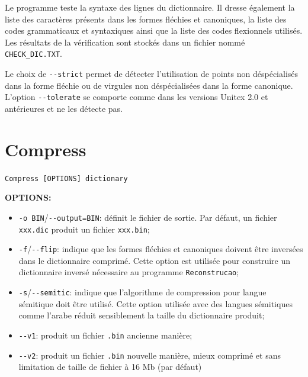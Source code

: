 \bigskip
\noindent Le programme teste la syntaxe des lignes du dictionnaire. Il dresse également la liste des
caractères présents dans les formes fléchies et canoniques, la liste des codes grammaticaux
et syntaxiques ainsi que la liste des codes flexionnels utilisés. Les résultats de la vérification
sont stockés dans un fichier nommé \verb+CHECK_DIC.TXT+.

\bigskip
\noindent Le choix de \verb+--strict+ permet de détecter l'utilisation de points non déspécialisés
dans la forme fléchie ou de virgules non déspécialisées dans la forme canonique. L'option
\verb+--tolerate+ se comporte comme dans les versions Unitex 2.0 et antérieures et ne les détecte
pas.





\section{Compress}
\label{section-compress}
\verb+Compress [OPTIONS] dictionary+

\bigskip
\noindent \textbf{OPTIONS:}
\begin{itemize}
\item \verb+-o BIN+/\verb+--output=BIN+: définit le fichier de sortie. Par défaut, un fichier
	\verb+xxx.dic+ produit un fichier \verb+xxx.bin+;
\item \verb+-f+/\verb+--flip+: indique que les formes fléchies et canoniques doivent être inversées
dans le dictionnaire comprimé. Cette option est utilisée pour construire un dictionnaire inversé
nécessaire au programme \verb+Reconstrucao+;
\item \verb+-s+/\verb+--semitic+: indique que l'algorithme de compression pour langue sémitique doit
être utilisé. Cette option utilisée avec des langues sémitiques comme l'arabe réduit sensiblement la
taille du dictionnaire produit;
\item \verb+--v1+: produit un fichier \verb+.bin+ ancienne manière;
\item \verb+--v2+: produit un fichier \verb+.bin+ nouvelle manière, mieux comprimé et sans
	limitation de taille de fichier à 16 Mb (par défaut)
\end{itemize}


